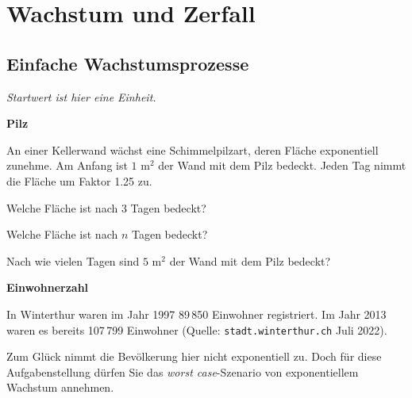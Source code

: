 


\renewcommand{\bbwAufgabenBlockID}{FctWZ}%

\renewcommand{\metaHeaderLine}{Exponentialfunktionen}
\renewcommand{\arbeitsblattTitel}{Aufgaben zu Wachstum und Zerfall}



\arbeitsblattHeader{}

\section{Wachstum und Zerfall}

\subsection{Einfache Wachstumsprozesse}
\textit{Startwert ist hier eine Einheit.}


\bbwActAufgabenNr{} \textbf{Pilz}

An einer Kellerwand wächst eine Schimmelpilzart, deren Fläche
exponentiell zunehme.
Am Anfang ist $1 \textrm{ m}^2$ der Wand mit dem Pilz bedeckt. Jeden Tag nimmt die Fläche um Faktor 1.25 zu.

\begin{bbwAufgabenBlock}
\item Welche Fläche ist nach 3 Tagen bedeckt?
\item Welche Fläche ist nach $n$ Tagen bedeckt?
\item Nach wie vielen Tagen sind $5 \textrm{ m}^2$ der Wand mit dem Pilz bedeckt?
\end{bbwAufgabenBlock}
\platzFuerBerechnungenBisEndeSeite{}



\bbwActAufgabenNr{} \textbf{Einwohnerzahl}

In Winterthur waren im Jahr 1997 89\,850 Einwohner registriert. Im Jahr 2013 waren es
bereits 107\,799 Einwohner (Quelle: \texttt{stadt.winterthur.ch} Juli 2022).

Zum Glück nimmt die Bevölkerung hier nicht exponentiell zu. Doch für
diese Aufgabenstellung dürfen Sie das \textit{worst case}-Szenario von
exponentiellem Wachstum annehmen.

